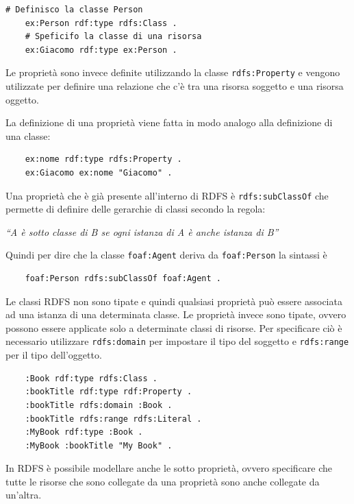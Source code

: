 \begin{lstlisting}[language=RDFA]
	# Definisco la classe Person
	ex:Person rdf:type rdfs:Class .
	# Speficifo la classe di una risorsa
	ex:Giacomo rdf:type ex:Person .
\end{lstlisting} 

Le proprietà sono invece definite utilizzando la classe \texttt{rdfs:Property} e vengono utilizzate per definire una relazione che c'è tra una risorsa soggetto e una risorsa oggetto.

La definizione di una proprietà viene fatta in modo analogo alla definizione di una classe:

\begin{lstlisting}
	ex:nome rdf:type rdfs:Property .
	ex:Giacomo ex:nome "Giacomo" .
\end{lstlisting}

Una proprietà che è già presente all'interno di RDFS è \texttt{rdfs:subClassOf} che permette di definire delle gerarchie di classi secondo la regola:

\begin{center}
\textit{``A è sotto classe di B se ogni istanza di A è anche istanza di B''}
\end{center}

Quindi per dire che la classe \texttt{foaf:Agent} deriva da \texttt{foaf:Person} la sintassi è

\begin{lstlisting}
	foaf:Person rdfs:subClassOf foaf:Agent .
\end{lstlisting} 

Le classi RDFS non sono tipate e quindi qualsiasi proprietà può essere associata ad una istanza di una determinata classe.
Le proprietà invece sono tipate, ovvero possono essere applicate solo a determinate classi di risorse. Per specificare ciò è necessario utilizzare \texttt{rdfs:domain} per impostare il tipo del soggetto e \texttt{rdfs:range} per il tipo dell'oggetto.

\begin{lstlisting}
	:Book rdf:type rdfs:Class .
	:bookTitle rdf:type rdf:Property .
	:bookTitle rdfs:domain :Book .
	:bookTitle rdfs:range rdfs:Literal .
	:MyBook rdf:type :Book .
	:MyBook :bookTitle "My Book" .
\end{lstlisting}

In RDFS è possibile modellare anche le sotto proprietà, ovvero specificare che tutte le risorse che sono collegate da una proprietà sono anche collegate da un'altra.


